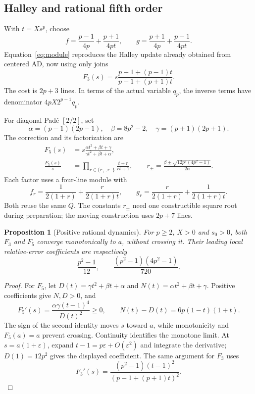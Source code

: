 \documentclass[11pt,a4paper]{article}
\newtheorem{proposition}[theorem]{Proposition}
\theoremstyle{remark}\newtheorem{remark}[theorem]{Remark}
\begin{document}
\subsection{Halley and rational fifth order}
With $t=Xs^p$, choose
\[
 f=\frac{p-1}{4p}+\frac{p+1}{4pt},\qquad
 g=\frac{p+1}{4p}+\frac{p-1}{4pt}.
\]
Equation~\eqref{eq:module} reproduces the Halley update already obtained from centered AD, now using only joins
\begin{equation}\label{eq:halley}
 F_3(s)=s\frac{p+1+(p-1)t}{p-1+(p+1)t}.
\end{equation}
The cost is $2p+3$ lines. In terms of the actual variable $q_p$, the inverse terms have denominator $4pX2^{p-1}q_p$.

For diagonal Pad\'e $[2/2]$, set
\[
 \alpha=(p-1)(2p-1),\quad \beta=8p^2-2,\quad \gamma=(p+1)(2p+1).
\]
The correction and its factorization are
\begin{align}
 F_5(s)&=s\frac{\alpha t^2+\beta t+\gamma}{\gamma t^2+\beta t+\alpha},\label{eq:rational5}\\
 \frac{F_5(s)}s&=\prod_{r\in\{r_+,r_-\}}\frac{t+r}{rt+1},\qquad
 r_\pm=\frac{\beta\pm\sqrt{12p^2(4p^2-1)}}{2\alpha}.
\end{align}
Each factor uses a four-line module with
\[
 f_r=\frac{1}{2(1+r)}+\frac{r}{2(1+r)t},\qquad
 g_r=\frac{r}{2(1+r)}+\frac{1}{2(1+r)t}.
\]
Both reuse the same $Q$. The constants $r_\pm$ need one constructible square root during preparation; the moving construction uses $2p+7$ lines.

\begin{proposition}[Positive rational dynamics]\label{prop:rational}
For $p\ge2$, $X>0$ and $s_0>0$, both $F_3$ and $F_5$ converge monotonically to $a$, without crossing it. Their leading local relative-error coefficients are respectively
\[
 \frac{p^2-1}{12},\qquad \frac{(p^2-1)(4p^2-1)}{720}.
\]
\end{proposition}
\begin{proof}
For $F_5$, let $D(t)=\gamma t^2+\beta t+\alpha$ and $N(t)=\alpha t^2+\beta t+\gamma$. Positive coefficients give $N,D>0$, and
\[
 F_5'(s)=\frac{\alpha\gamma(t-1)^4}{D(t)^2}\ge0,\qquad N(t)-D(t)=6p(1-t)(1+t).
\]
The sign of the second identity moves $s$ toward $a$, while monotonicity and $F_5(a)=a$ prevent crossing. Continuity identifies the monotone limit. At $s=a(1+\varepsilon)$, expand $t-1=p\varepsilon+O(\varepsilon^2)$ and integrate the derivative; $D(1)=12p^2$ gives the displayed coefficient. The same argument for $F_3$ uses
\[
 F_3'(s)=\frac{(p^2-1)(t-1)^2}{(p-1+(p+1)t)^2}.
\]
\end{proof}
\end{document}
